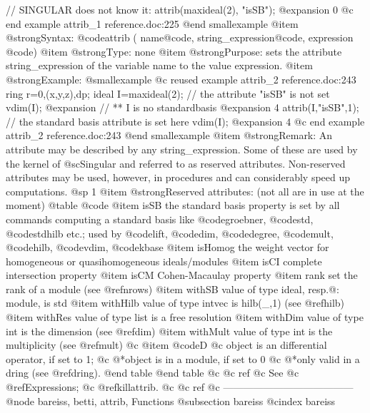   // SINGULAR does not know it:
  attrib(maxideal(2), "isSB");
@expansion{} 0
@c end example attrib_1 reference.doc:225
@end smallexample
@item @strong{Syntax:}
@code{attrib (} name@code{,} string_expression@code{,} expression @code{)}
@item @strong{Type:}
none
@item @strong{Purpose:}
sets the attribute string_expression of the variable name
to the value expression.
@item @strong{Example:}
@smallexample
@c reused example attrib_2 reference.doc:243 
  ring r=0,(x,y,z),dp;
  ideal I=maxideal(2); // the attribute "isSB" is not set
  vdim(I);
@expansion{} // ** I is no standardbasis
@expansion{} 4
  attrib(I,"isSB",1);  // the standard basis attribute is set here
  vdim(I);
@expansion{} 4
@c end example attrib_2 reference.doc:243
@end smallexample
@item @strong{Remark:}
An attribute may be described by any string_expression. Some of these are
used by the kernel of @sc{Singular} and referred to as reserved attributes.
Non-reserved attributes may be used, however, in procedures and can
considerably speed up computations.
@sp 1
@item @strong{Reserved attributes:}
(not all are in use at the moment)
@table @code
@item isSB
the standard basis property is set by all commands computing a standard
basis like
@code{groebner}, @code{std}, @code{stdhilb} etc.; used by @code{lift}, @code{dim},
@code{degree}, @code{mult}, @code{hilb}, @code{vdim}, @code{kbase}
@item isHomog
the weight vector for homogeneous or quasihomogeneous ideals/modules
@item isCI
complete intersection property
@item isCM
Cohen-Macaulay property
@item rank
set the rank of a module (see @ref{nrows})
@item withSB
value of type ideal, resp.@: module, is std
@item withHilb
value of type intvec is hilb(_,1) (see @ref{hilb})
@item withRes
value of type list is a free resolution
@item withDim
value of type int is the dimension (see @ref{dim})
@item withMult
value of type int is the multiplicity (see @ref{mult})
@c @item @code{D}
@c object is an differential operator, if set to 1;
@c @*object is in a module, if set to 0
@c @*only valid in a dring (see @ref{dring}).
@end table
@end table
@c @c ref
@c See
@c @ref{Expressions};
@c @ref{killattrib}.
@c @c ref
@c ---------------------------------------
@node bareiss, betti, attrib, Functions
@subsection bareiss
@cindex bareiss

